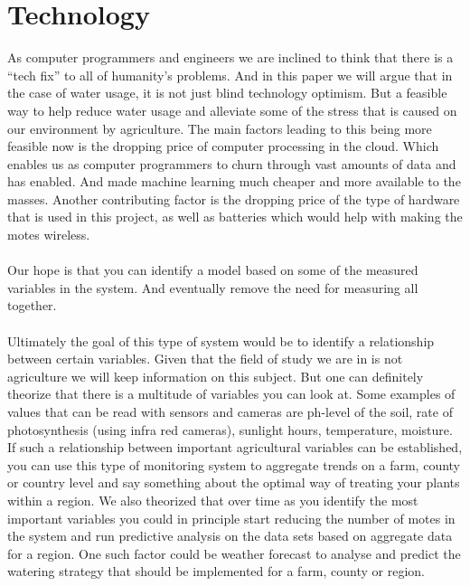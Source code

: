 \documentclass[]{uiophd}
\begin{document}
\section{Technology}
As computer programmers and engineers we are inclined to think that there is a “tech fix” to all of humanity's problems. And in this paper we will argue that in the case of water usage, it is not just blind technology optimism. But a feasible way to help reduce water usage and alleviate some of the stress that is caused on our environment by agriculture. The main factors leading to this being more feasible now is the dropping price of computer processing in the cloud. Which enables us as computer programmers to churn through vast amounts of data and has enabled. And made machine learning much cheaper and more available to the masses. Another contributing factor is the dropping price of the type of hardware that is used in this project, as well as batteries which would help with making the motes wireless.
\\\\
Our hope is that you can identify a model based on some of the measured variables in the system. And eventually remove the need for measuring all together. 
\\\\
Ultimately the goal of this type of system would be to identify a relationship between certain variables.  Given that the field of study we are in is not agriculture we will keep information on this subject. But one can definitely theorize that there is a multitude of variables you can look at. Some examples of values that can be read with sensors and cameras are ph-level of the soil, rate of photosynthesis (using infra red cameras), sunlight hours, temperature, moisture. If such a relationship between important agricultural variables can be established, you can use this type of monitoring system to aggregate trends on a farm, county or country level and say something about the optimal way of treating your plants within a region. We also theorized that over time as you identify the most important variables you could in principle start reducing the number of motes in the system and run predictive analysis on the data sets based on aggregate data for a region. One such factor could be weather forecast to analyse and predict the watering strategy that should be implemented for a farm, county or region. 
\end{document}
